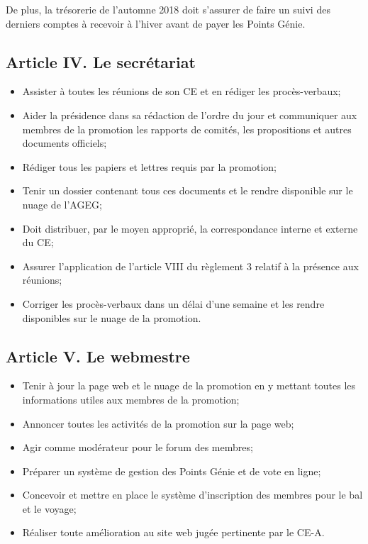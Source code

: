  De plus, la trésorerie de l’automne 2018 doit s’assurer de faire un suivi des derniers comptes à recevoir à l’hiver avant de payer les Points Génie.
 

\subsection*{Article IV. Le secrétariat}
\begin{itemize}
    \item Assister à toutes les réunions de son CE et en rédiger les procès-verbaux;
    \item Aider la présidence dans sa rédaction de l'ordre du jour et communiquer aux membres de la promotion les rapports de comités, les propositions et autres documents officiels;
    \item Rédiger tous les papiers et lettres requis par la promotion;
    \item Tenir un dossier contenant tous ces documents et le rendre disponible sur le nuage de l’AGEG;
    \item Doit distribuer, par le moyen approprié, la correspondance interne et externe du CE;
    \item Assurer l’application de l’article VIII du règlement 3 relatif à la présence aux réunions;
    \item Corriger les procès-verbaux dans un délai d'une semaine et les rendre disponibles sur le nuage de la promotion.
\end{itemize}

\subsection*{Article V. Le webmestre}
\begin{itemize}
    \item Tenir à jour la page web et le nuage de la promotion en y mettant toutes les informations utiles aux membres de la promotion;
    \item Annoncer toutes les activités de la promotion sur la page web;
    \item Agir comme modérateur pour le forum des membres;
    \item Préparer un système de gestion des Points Génie et de vote en ligne;
    \item Concevoir et mettre en place le système d'inscription des membres pour le bal et le voyage;
    \item Réaliser toute amélioration au site web jugée pertinente par le CE-A.
\end{itemize}

